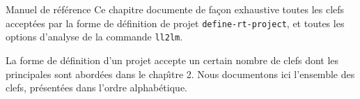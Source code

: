  {Manuel de r\'{e}f\'{e}rence}
Ce chapitre documente de fa\c{c}on exhaustive toutes les clefs accept\'{e}es
par la forme de d\'{e}finition
de projet {\tt define-rt-project}, et toutes les
options d'analyse de la commande {\tt ll2lm}.

La forme de d\'{e}finition d'un projet accepte un certain nombre de clefs
dont les principales sont abord\'{e}es dans le chap\^{\i}tre 2.  Nous documentons
ici l'ensemble des clefs, pr\'{e}sent\'{e}es dans l'ordre
alphab\'{e}tique. 

